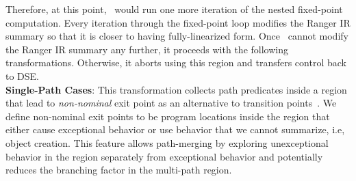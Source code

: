%
Therefore, at this point, \tool\ would run one more iteration of the nested fixed-point computation.
%
Every iteration through the fixed-point loop modifies the Ranger IR summary so that it is closer to having fully-linearized
form.
%
Once \tool\ cannot modify the Ranger IR summary any further, it proceeds with the following transformations.
%
Otherwise, it aborts using this region and transfers control back to DSE.\\
%
\textbf{Single-Path Cases}: This transformation collects path predicates inside a region that lead to
\textit{non-nominal} exit point as an alternative to transition points~\cite{veritesting}.
%
We define non-nominal exit points to be program locations inside the region that either cause
exceptional behavior or use behavior that we cannot summarize, i.e, object creation.
%
This feature allows path-merging by exploring unexceptional behavior in the region separately from
exceptional behavior and potentially reduces the branching factor in the multi-path region.
%
%

